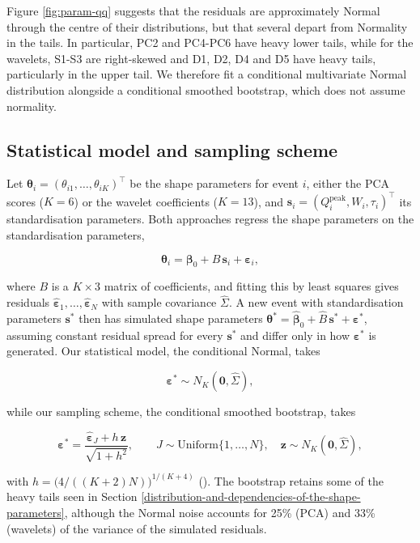 \documentclass[
  11pt,
  a4paper]{article}
\begin{document}
Figure \ref{fig:param-qq} suggests that the residuals are approximately Normal through the centre of their distributions, but that several depart from Normality in the tails. In particular, PC2 and PC4-PC6 have heavy lower tails, while for the wavelets, S1-S3 are right-skewed and D1, D2, D4 and D5 have heavy tails, particularly in the upper tail. We therefore fit a conditional multivariate Normal distribution alongside a conditional smoothed bootstrap, which does not assume normality.

\subsection{Statistical model and sampling scheme}\label{model}

Let \(\boldsymbol{\theta}_i = (\theta_{i1}, \dots, \theta_{iK})^\top\) be the shape parameters for event \(i\), either the PCA scores (\(K = 6\)) or the wavelet coefficients (\(K = 13\)), and \(\mathbf{s}_i = (Q_i^{\text{peak}}, W_i, \tau_i)^\top\) its standardisation parameters. Both approaches regress the shape parameters on the standardisation parameters,

\[
\boldsymbol{\theta}_i = \boldsymbol{\beta}_0 + B\,\mathbf{s}_i + \boldsymbol{\varepsilon}_i,
\]

where \(B\) is a \(K \times 3\) matrix of coefficients, and fitting this by least squares gives residuals \(\hat{\boldsymbol{\varepsilon}}_1, \dots, \hat{\boldsymbol{\varepsilon}}_N\) with sample covariance \(\hat{\Sigma}\). A new event with standardisation parameters \(\mathbf{s}^\ast\) then has simulated shape parameters \(\boldsymbol{\theta}^\ast = \hat{\boldsymbol{\beta}}_0 + \hat{B}\,\mathbf{s}^\ast + \boldsymbol{\varepsilon}^\ast\), assuming constant residual spread for every \(\mathbf{s}^\ast\) and differ only in how \(\boldsymbol{\varepsilon}^\ast\) is generated. Our statistical model, the conditional Normal, takes

\[
\boldsymbol{\varepsilon}^\ast \sim N_K(\mathbf{0}, \hat{\Sigma}),
\]

while our sampling scheme, the conditional smoothed bootstrap, takes

\[
\boldsymbol{\varepsilon}^\ast = \frac{\hat{\boldsymbol{\varepsilon}}_J + h\,\mathbf{z}}{\sqrt{1+h^2}}, \qquad J \sim \text{Uniform}\{1,\dots,N\}, \quad \mathbf{z} \sim N_K(\mathbf{0}, \hat{\Sigma}),
\]

with \(h = \big(4/((K+2)N)\big)^{1/(K+4)}\) (). The bootstrap retains some of the heavy tails seen in Section \ref{distribution-and-dependencies-of-the-shape-parameters}, although the Normal noise accounts for 25\% (PCA) and 33\% (wavelets) of the variance of the simulated residuals.
\end{document}
